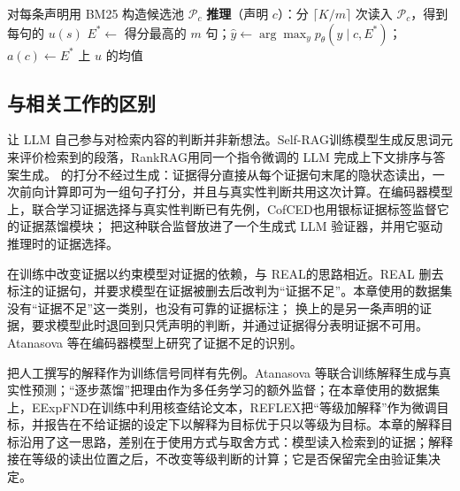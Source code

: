 \begin{algorithm}[htbp]
\caption{\ours{} 的训练与推理}\label{alg:ob}
对每条声明用 BM25 构造候选池 $\mathcal P_c$\;
\BlankLine
\textbf{推理}（声明 $c$）：分 $\lceil K/m\rceil$ 次读入 $\mathcal P_c$，得到每句的 $u(s)$\;
$E^{*}\leftarrow$ 得分最高的 $m$ 句；$\hat y\leftarrow\arg\max_y p_\theta(y\mid c,E^{*})$；$a(c)\leftarrow E^{*}$ 上 $u$ 的均值\;
\end{algorithm}

\subsection{与相关工作的区别}

让 LLM 自己参与对检索内容的判断并非新想法。Self-RAG\citep{asai2024selfrag}训练模型生成反思词元来评价检索到的段落，RankRAG\citep{yu2024rankrag}用同一个指令微调的 LLM 完成上下文排序与答案生成。\ours{} 的打分不经过生成：证据得分直接从每个证据句末尾的隐状态读出，一次前向计算即可为一组句子打分，并且与真实性判断共用这次计算。在编码器模型上，联合学习证据选择与真实性判断已有先例\citep{fajcik2022claimdissector,wadden2021multivers}，CofCED\citep{yang2022cofced}也用银标证据标签监督它的证据蒸馏模块；\ours{} 把这种联合监督放进了一个生成式 LLM 验证器，并用它驱动推理时的证据选择。

在训练中改变证据以约束模型对证据的依赖，与 REAL\citep{deng2026real}的思路相近。REAL 删去标注的证据句，并要求模型在证据被删去后改判为“证据不足”。本章使用的数据集没有“证据不足”这一类别，也没有可靠的证据标注；\ours{} 换上的是另一条声明的证据，要求模型此时退回到只凭声明的判断，并通过证据得分表明证据不可用。Atanasova 等\citep{atanasova2022insufficient}在编码器模型上研究了证据不足的识别。

把人工撰写的解释作为训练信号同样有先例。Atanasova 等\citep{atanasova2020generating}联合训练解释生成与真实性预测；“逐步蒸馏”\citep{hsieh2023distilling}把理由作为多任务学习的额外监督；在本章使用的数据集上，EExpFND\citep{wang2025eexpfnd}在训练中利用核查结论文本，REFLEX\citep{kong2026reflex}把“等级加解释”作为微调目标，并报告在不给证据的设定下以解释为目标优于只以等级为目标。本章的解释目标沿用了这一思路，差别在于使用方式与取舍方式：模型读入检索到的证据；解释接在等级的读出位置之后，不改变等级判断的计算；它是否保留完全由验证集决定。

